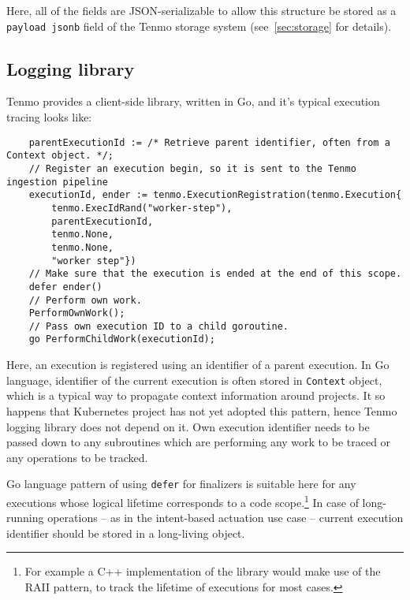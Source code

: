 Here, all of the fields are JSON-serializable to allow this structure be stored as a \texttt{payload jsonb} field of the Tenmo storage system (see~\cref{sec:storage} for details).

\subsection{Logging library}\label{sec:logging-library}

Tenmo provides a client-side library, written in Go, and it’s typical execution tracing looks like:
%
\begin{verbatim}
    parentExecutionId := /* Retrieve parent identifier, often from a Context object. */;
    // Register an execution begin, so it is sent to the Tenmo ingestion pipeline
    executionId, ender := tenmo.ExecutionRegistration(tenmo.Execution{
        tenmo.ExecIdRand("worker-step"),
        parentExecutionId,
        tenmo.None,
        tenmo.None,
        "worker step"})
    // Make sure that the execution is ended at the end of this scope.
    defer ender()
    // Perform own work.
    PerformOwnWork();
    // Pass own execution ID to a child goroutine.
    go PerformChildWork(executionId);
\end{verbatim}

Here, an execution is registered using an identifier of a parent execution. In Go language, identifier of the current execution is often stored in \texttt{Context} object, which is a typical way to propagate context information around projects. It so happens that Kubernetes project has not yet adopted this pattern, hence Tenmo logging library does not depend on it. Own execution identifier needs to be passed down to any subroutines which are performing any work to be traced or any operations to be tracked.

Go language pattern of using \texttt{defer} for finalizers is suitable here for any executions whose logical lifetime corresponds to a code scope.\footnote{For example a C++ implementation of the library would make use of the RAII pattern, to track the lifetime of executions for most cases.} In case of long-running operations -- as in the intent-based actuation use case -- current execution identifier should be stored in a long-living object.

